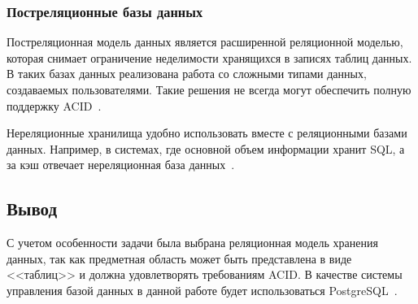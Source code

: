  
\subsubsection{Постреляционные базы данных}

Постреляционная модель данных является расширенной реляционной моделью, которая снимает ограничение неделимости хранящихся в записях таблиц данных. В таких базах данных реализована работа со сложными типами данных, создаваемых пользователями. Такие решения не всегда могут обеспечить полную поддержку ACID~\cite{acid}. 

Нереляционные хранилища удобно использовать вместе с реляционными базами данных. Например, в системах, где основной объем информации хранит SQL, а за кэш отвечает нереляционная база данных~\cite{amazon}.

\subsection*{Вывод}

С учетом особенности задачи была выбрана реляционная модель хранения данных, так как предметная область может быть представлена в виде <<таблиц>> и должна удовлетворять требованиям ACID. В качестве системы управления базой данных в данной работе будет использоваться PostgreSQL~\cite{postgres}.

